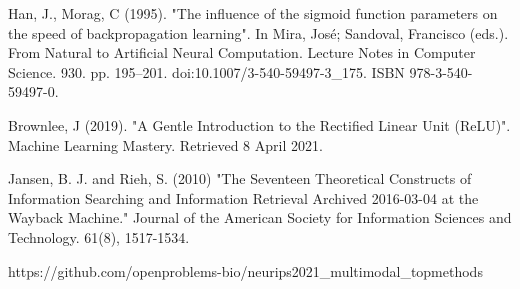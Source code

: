 \begin{thebibliography}{25}
 Han, J., Morag, C (1995). "The influence of the sigmoid function parameters on the speed of backpropagation learning". In Mira, José; Sandoval, Francisco (eds.). From Natural to Artificial Neural Computation. Lecture Notes in Computer Science. 930. pp. 195–201. doi:10.1007/3-540-59497-3\_175. ISBN 978-3-540-59497-0.

 Brownlee, J (2019). "A Gentle Introduction to the Rectified Linear Unit (ReLU)". Machine Learning Mastery. Retrieved 8 April 2021.

 Jansen, B. J. and Rieh, S. (2010) "The Seventeen Theoretical Constructs of Information Searching and Information Retrieval Archived 2016-03-04 at the Wayback Machine." Journal of the American Society for Information Sciences and Technology. 61(8), 1517-1534.

 https://github.com/openproblems-bio/neurips2021\_multimodal\_topmethods

\end{thebibliography}
